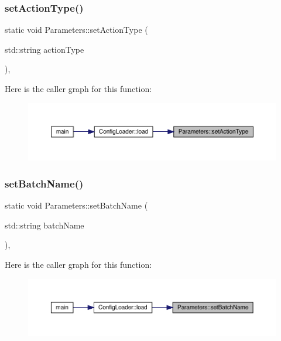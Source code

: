 \subsubsection{\texorpdfstring{setActionType()}{setActionType()}}
{\footnotesize\ttfamily static void Parameters\+::set\+Action\+Type (\begin{DoxyParamCaption}\item[{std\+::string}]{action\+Type }\end{DoxyParamCaption})\hspace{0.3cm}{\ttfamily [inline]}, {\ttfamily [static]}}

Here is the caller graph for this function\+:
\nopagebreak
\begin{figure}[H]
\begin{center}
\leavevmode
\includegraphics[width=350pt]{class_parameters_aa7436b658d07358009b922584798fb6d_icgraph}
\end{center}
\end{figure}
\mbox{\label{class_parameters_a8e349761195db7184f309e0f074da84d}} 
\subsubsection{\texorpdfstring{setBatchName()}{setBatchName()}}
{\footnotesize\ttfamily static void Parameters\+::set\+Batch\+Name (\begin{DoxyParamCaption}\item[{std\+::string}]{batch\+Name }\end{DoxyParamCaption})\hspace{0.3cm}{\ttfamily [inline]}, {\ttfamily [static]}}

Here is the caller graph for this function\+:
\nopagebreak
\begin{figure}[H]
\begin{center}
\leavevmode
\includegraphics[width=350pt]{class_parameters_a8e349761195db7184f309e0f074da84d_icgraph}
\end{center}
\end{figure}
\mbox{\label{class_parameters_a8462149cb29ecf936f1f9945f5de4908}} 
